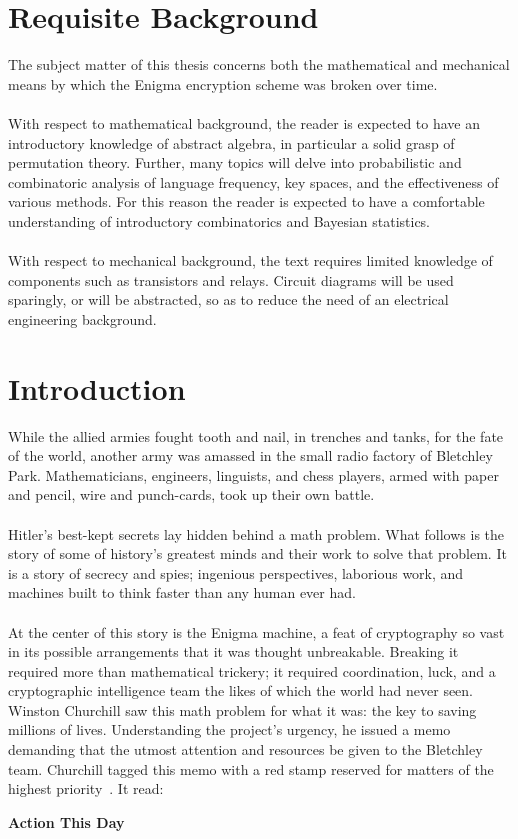 \documentclass{dcthesis}
\theoremstyle{definition}
\theoremstyle{remark}
\begin{document}
\chapter*{Requisite Background}
The subject matter of this thesis concerns both the mathematical and
mechanical means by which the Enigma encryption scheme was broken over time.
\\\\With respect to mathematical background, the reader is expected
to have an introductory knowledge of abstract algebra, in particular
a solid grasp of permutation theory. Further, many topics will delve
into probabilistic and combinatoric analysis of language frequency,
key spaces, and the effectiveness of various methods. For this reason
the reader is expected to have a comfortable understanding of
introductory combinatorics and Bayesian statistics.
\\\\With respect to mechanical background, the text requires
limited knowledge of components such as transistors and relays.
Circuit diagrams will be used sparingly, or will be abstracted, so as
to reduce the need of an electrical engineering background.

\chapter*{Introduction}
While the allied armies fought tooth and nail, in trenches and tanks,
for the fate of the world, another army was amassed in the small
radio factory of Bletchley Park. Mathematicians, engineers,
linguists, and chess players, armed with paper and pencil, wire and
punch-cards, took up their own battle.
\\\\Hitler's best-kept secrets lay hidden behind a math problem. What
follows is the story of some of history's greatest minds and their
work to solve that problem. It is a story of secrecy and spies;
ingenious perspectives, laborious work, and machines built to think
faster than any human ever had.
\\\\At the center of this story is the Enigma machine, a feat of
cryptography so vast in its possible arrangements that it was thought
unbreakable. Breaking it required more than mathematical trickery; it
required coordination, luck, and a cryptographic intelligence team
the likes of which the world had never seen. Winston Churchill saw
this math problem for what it was: the key to saving millions of
lives. Understanding the project's urgency, he issued a memo
demanding that the utmost attention and resources be given to the
Bletchley team. Churchill tagged this memo with a red stamp reserved
for matters of the highest priority~\cite[p.~336]{action_this_day}. It read:
\begin{center}
  \textbf{Action This Day}
\end{center}
\mainmatter





\end{document}
